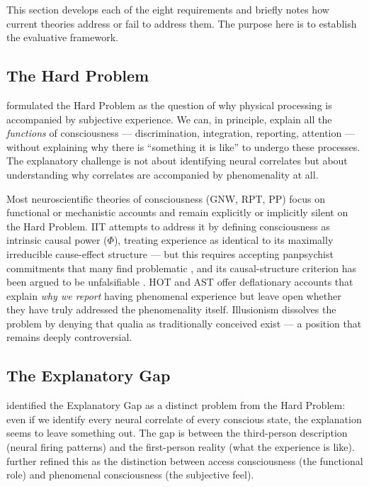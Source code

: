 \documentclass[12pt]{article}
\begin{document}
This section develops each of the eight requirements and briefly notes how current theories address or fail to address them. The purpose here is to establish the evaluative framework.


\subsection{The Hard Problem}


\citet{Chalmers1995,Chalmers1996} formulated the Hard Problem as the question of why physical processing is accompanied by subjective experience. We can, in principle, explain all the \emph{functions} of consciousness --- discrimination, integration, reporting, attention --- without explaining why there is ``something it is like'' \citep{Nagel1974} to undergo these processes. The explanatory challenge is not about identifying neural correlates but about understanding why correlates are accompanied by phenomenality at all.

Most neuroscientific theories of consciousness (GNW, RPT, PP) focus on functional or mechanistic accounts and remain explicitly or implicitly silent on the Hard Problem. IIT attempts to address it by defining consciousness as intrinsic causal power ($\Phi$), treating experience as identical to its maximally irreducible cause-effect structure --- but this requires accepting panpsychist commitments that many find problematic \citep{Bayne2018,Cerullo2015,Merker2021}, and its causal-structure criterion has been argued to be unfalsifiable \citep{Doerig2019}. HOT and AST offer deflationary accounts that explain \emph{why we report} having phenomenal experience but leave open whether they have truly addressed the phenomenality itself. Illusionism \citep{Dennett1991,Frankish2016} dissolves the problem by denying that qualia as traditionally conceived exist --- a position that remains deeply controversial.


\subsection{The Explanatory Gap}


\citet{Levine1983} identified the Explanatory Gap as a distinct problem from the Hard Problem: even if we identify every neural correlate of every conscious state, the explanation seems to leave something out. The gap is between the third-person description (neural firing patterns) and the first-person reality (what the experience is like). \citet{Block1995,Block2007} further refined this as the distinction between access consciousness (the functional role) and phenomenal consciousness (the subjective feel).
\end{document}
